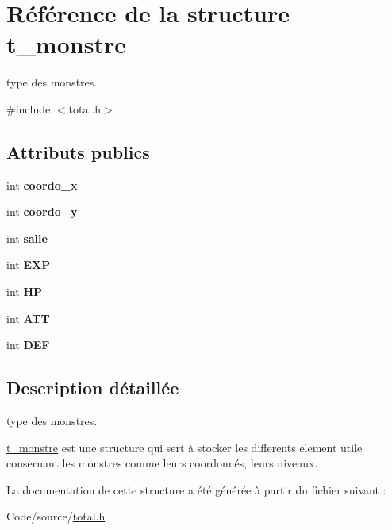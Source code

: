 \hypertarget{structt__monstre}{\section{Référence de la structure t\-\_\-monstre}
\label{structt__monstre}
}


type des monstres.  




{\ttfamily \#include $<$total.\-h$>$}

\subsection*{Attributs publics}
\begin{DoxyCompactItemize}
\item 
\hypertarget{structt__monstre_a42819071d12918855eda37dd9d05a587}{int {\bfseries coordo\-\_\-x}}\label{structt__monstre_a42819071d12918855eda37dd9d05a587}

\item 
\hypertarget{structt__monstre_a383ff5a904ebc0f98bdab99293c97199}{int {\bfseries coordo\-\_\-y}}\label{structt__monstre_a383ff5a904ebc0f98bdab99293c97199}

\item 
\hypertarget{structt__monstre_ad45c60cbcf47e11e06f82d9ebf4900ad}{int {\bfseries salle}}\label{structt__monstre_ad45c60cbcf47e11e06f82d9ebf4900ad}

\item 
\hypertarget{structt__monstre_a18e858f4e45b07e77c6ecbdf75a099e2}{int {\bfseries E\-X\-P}}\label{structt__monstre_a18e858f4e45b07e77c6ecbdf75a099e2}

\item 
\hypertarget{structt__monstre_a1c4c4424d4d5ff449c5e2a1c2752670a}{int {\bfseries H\-P}}\label{structt__monstre_a1c4c4424d4d5ff449c5e2a1c2752670a}

\item 
\hypertarget{structt__monstre_a42bf712bc741f80355f81ce421f83bb2}{int {\bfseries A\-T\-T}}\label{structt__monstre_a42bf712bc741f80355f81ce421f83bb2}

\item 
\hypertarget{structt__monstre_ae77a0567bdf7c7eb72a5a30a3cdd438f}{int {\bfseries D\-E\-F}}\label{structt__monstre_ae77a0567bdf7c7eb72a5a30a3cdd438f}

\end{DoxyCompactItemize}


\subsection{Description détaillée}
type des monstres. 

\hyperlink{structt__monstre}{t\-\_\-monstre} est une structure qui sert à stocker les differents element utile consernant les monstres comme leurs coordonnés, leurs niveaux. 

La documentation de cette structure a été générée à partir du fichier suivant \-:\begin{DoxyCompactItemize}
\item 
Code/source/\hyperlink{total_8h}{total.\-h}\end{DoxyCompactItemize}
